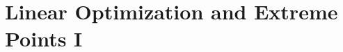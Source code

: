 \documentclass[main]{subfiles}
\begin{document}

\section{Linear Optimization and Extreme Points I}

\end{document}
